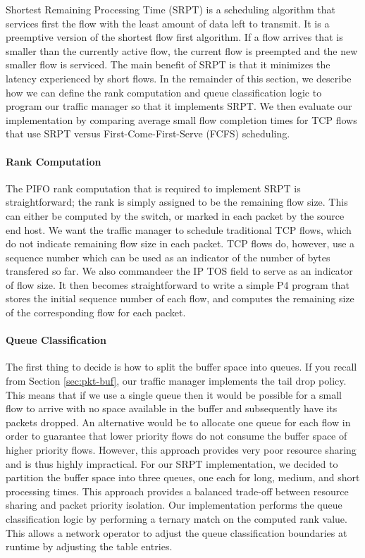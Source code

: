 Shortest Remaining Processing Time (SRPT) is a scheduling algorithm that services first the flow with the least amount of data left to transmit. It is a preemptive version of the shortest flow first algorithm. If a flow arrives that is smaller than the currently active flow, the current flow is preempted and the new smaller flow is serviced. The main benefit of SRPT is that it minimizes the latency experienced by short flows. In the remainder of this section, we describe how we can define the rank computation and queue classification logic to program our traffic manager so that it implements SRPT. We then evaluate our implementation by comparing average small flow completion times for TCP flows that use SRPT versus First-Come-First-Serve (FCFS) scheduling.

\paragraph{Rank Computation}
The PIFO rank computation that is required to implement SRPT is straightforward; the rank is simply assigned to be the remaining flow size. This can either be computed by the switch, or marked in each packet by the source end host. We want the traffic manager to schedule traditional TCP flows, which do not indicate remaining flow size in each packet. TCP flows do, however, use a sequence number which can be used as an indicator of the number of bytes transfered so far. We also commandeer the IP TOS field to serve as an indicator of flow size. It then becomes straightforward to write a simple P4 program that stores the initial sequence number of each flow, and computes the remaining size of the corresponding flow for each packet.

\paragraph{Queue Classification}
The first thing to decide is how to split the buffer space into queues. If you recall from Section \ref{sec:pkt-buf}, our traffic manager implements the tail drop policy. This means that if we use a single queue then it would be possible for a small flow to arrive with no space available in the buffer and subsequently have its packets dropped. An alternative would be to allocate one queue for each flow in order to guarantee that lower priority flows do not consume the buffer space of higher priority flows. However, this approach provides very poor resource sharing and is thus highly impractical. For our SRPT implementation, we decided to partition the buffer space into three queues, one each for long, medium, and short processing times. This approach provides a balanced trade-off between resource sharing and packet priority isolation. Our implementation performs the queue classification logic by performing a ternary match on the computed rank value. This allows a network operator to adjust the queue classification boundaries at runtime by adjusting the table entries.

